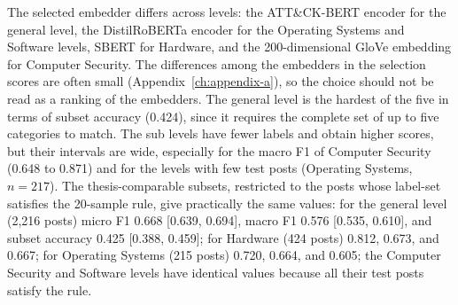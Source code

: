 \begin{table}
    \centering
    \caption{\textbf{Categorization levels of the Two-Step System} on the test partition (all test posts of each level).}
    \label{tab:two-step-levels}
    \footnotesize
\end{table}

The selected embedder differs across levels: the ATT{\&}CK-BERT encoder for the general level, the DistilRoBERTa encoder for the Operating Systems and Software levels, SBERT for Hardware, and the 200-dimensional GloVe embedding for Computer Security. The differences among the embedders in the selection scores are often small (Appendix~\ref{ch:appendix-a}), so the choice should not be read as a ranking of the embedders. The general level is the hardest of the five in terms of subset accuracy (0.424), since it requires the complete set of up to five categories to match. The sub levels have fewer labels and obtain higher scores, but their intervals are wide, especially for the macro F1 of Computer Security (0.648 to 0.871) and for the levels with few test posts (Operating Systems, $n = 217$). The thesis-comparable subsets, restricted to the posts whose label-set satisfies the 20-sample rule, give practically the same values: for the general level (2,216 posts) micro F1 0.668 [0.639, 0.694], macro F1 0.576 [0.535, 0.610], and subset accuracy 0.425 [0.388, 0.459]; for Hardware (424 posts) 0.812, 0.673, and 0.667; for Operating Systems (215 posts) 0.720, 0.664, and 0.605; the Computer Security and Software levels have identical values because all their test posts satisfy the rule.

